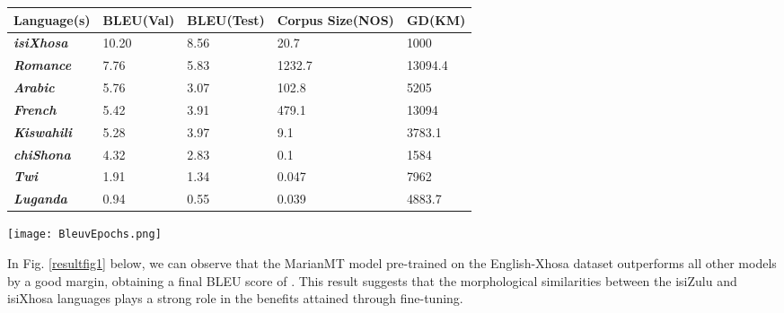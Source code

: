 \documentclass[11pt]{article}
\begin{document}
    
\begin{table*}
\centering

\begin{tabular}{|l|l|l|l|l|}
\hline
\textbf{Language(s)}        & \textbf{BLEU(Val)} & \textbf{BLEU(Test)} & \textbf{Corpus Size(NOS)} & \textbf{GD(KM)} \\ \hline
\textit{\textbf{isiXhosa}}  & 10.20                & 8.56                & 20.7                    & 1000              \\ \hline
\textit{\textbf{Romance}}   & 7.76                 & 5.83                & 1232.7                  & 13094.4           \\ \hline
\textit{\textbf{Arabic}}    & 5.76                 & 3.07                & 102.8                   & 5205              \\ \hline
\textit{\textbf{French}}    & 5.42                 & 3.91                & 479.1                   & 13094             \\ \hline
\textit{\textbf{Kiswahili}} & 5.28                 & 3.97                & 9.1                     & 3783.1            \\ \hline
\textit{\textbf{chiShona}}  & 4.32                 & 2.83                & 0.1                     & 1584              \\ \hline
\textit{\textbf{Twi}}       & 1.91                 & 1.34                & 0.047                   & 7962            \\ \hline
\textit{\textbf{Luganda}}   & 0.94                 & 0.55                & 0.039                   & 4883.7            \\ \hline
\end{tabular}
\caption{BLEU scores, GD and corpora size}
\label{table1}
\end{table*}



\begin{figure*}[h!]
\centering
\texttt{[image: BleuvEpochs.png]}
\caption{BLEU scores per epoch according to different pre-training languages, indicates high performance of morphologically similar isiXhosa, which outperforms a model trained on a very large corpora and rest of corpora.}
\label{resultfig1}
\end{figure*}

In Fig. \ref{resultfig1} below, we can observe that the MarianMT model pre-trained on the English-Xhosa dataset outperforms all other models by a good margin, obtaining a final BLEU score of . This result suggests that the morphological similarities between the isiZulu and isiXhosa languages plays a strong role in the benefits attained through fine-tuning.
\end{document}
